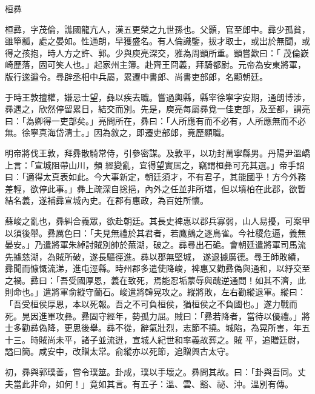 
\begin{pinyinscope}
桓彞



 桓彞，字茂倫，譙國龍亢人，漢五更榮之九世孫也。父顥，官至郎中。彞少孤貧，雖簞瓢，處之晏如。性通朗，早獲盛名。有人倫識鑒，拔才取士，或出於無聞，或得之孩抱，時人方之許、郭。少與庾亮深交，雅為周顗所重。顗嘗歎曰：「
 茂倫嶔崎歷落，固可笑人也。」起家州主簿。赴齊王冏義，拜騎都尉。元帝為安東將軍，版行逡遒令。尋辟丞相中兵屬，累遷中書郎、尚書吏部郎，名顯朝廷。



 于時王敦擅權，嫌忌士望，彝以疾去職。嘗過輿縣，縣宰徐寧字安期，通朗博涉，彞遇之，欣然停留累日，結交而別。先是，庾亮每屬彞覓一佳吏部，及至都，謂亮曰：「為卿得一吏部矣。」亮問所在，彞曰：「人所應有而不必有，人所應無而不必無。徐寧真海岱清士。」因為敘之，即遷吏部郎，竟歷顯職。



 明帝將伐王敦，拜彞散騎常侍，引參密謀。及敦平，以功封萬寧縣男。丹陽尹溫嶠上言：「宣城阻帶山川，頻
 經變亂，宜得望實居之，竊謂桓彝可充其選。」帝手詔曰：「適得太真表如此。今大事新定，朝廷須才，不有君子，其能國乎！方今外務差輕，欲停此事。」彝上疏深自捴挹，內外之任並非所堪，但以墳柏在此郡，欲暫結名義，遂補彞宣城內史。在郡有惠政，為百姓所懷。



 蘇峻之亂也，彞糾合義眾，欲赴朝廷。其長史裨惠以郡兵寡弱，山人易擾，可案甲以須後舉。彞厲色曰：「夫見無禮於其君者，若鷹鸇之逐鳥雀。今社稷危逼，義無晏安。」乃遣將軍朱綽討賊別帥於蕪湖，破之。彞尋出石硊。會朝廷遣將軍司馬流先據慈湖，為賊所破，遂長驅徑進。彞以郡無堅城，
 遂退據廣德。尋王師敗績，彞聞而慷慨流涕，進屯涇縣。時州郡多遣使降峻，裨惠又勸彞偽與通和，以紓交至之禍。彞曰：「吾受國厚恩，義在致死，焉能忍垢蒙辱與醜逆通問！如其不濟，此則命也。」遣將軍俞縱守蘭石。峻遣將韓晃攻之。縱將敗，左右勸縱退軍。縱曰：「吾受桓侯厚恩，本以死報。吾之不可負桓侯，猶桓侯之不負國也。」遂力戰而死。晃因進軍攻彝。彞固守經年，勢孤力屈。賊曰：「彞若降者，當待以優禮。」將士多勸彞偽降，更思後舉。彞不從，辭氣壯烈，志節不撓。城陷，為晃所害，年五十三。時賊尚未平，諸子並流迸，宣城人紀世和率義故葬之。賊
 平，追贈廷尉，謚曰簡。咸安中，改贈太常。俞縱亦以死節，追贈興古太守。



 初，彞與郭璞善，嘗令璞筮。卦成，璞以手壞之。彞問其故。曰：「卦與吾同。丈夫當此非命，如何！」竟如其言。有五子：溫、雲、豁、祕、沖。溫別有傳。




\end{pinyinscope}
